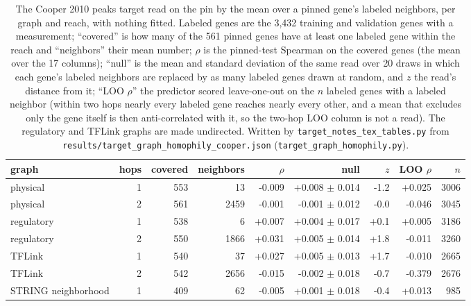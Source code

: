 \begin{table}[H]
  \centering
  \footnotesize
  \caption[Label propagation of Cooper 2010 peaks on the graphs]{The Cooper 2010 peaks target read on the pin by the mean over a pinned gene's labeled neighbors, per graph and reach, with nothing fitted. Labeled genes are the 3,432 training and validation genes with a measurement; ``covered'' is how many of the 561 pinned genes have at least one labeled gene within the reach and ``neighbors'' their mean number; $\rho$ is the pinned-test Spearman on the covered genes (the mean over the 17 columns); ``null'' is the mean and standard deviation of the same read over 20 draws in which each gene's labeled neighbors are replaced by as many labeled genes drawn at random, and $z$ the read's distance from it; ``LOO $\rho$'' the predictor scored leave-one-out on the $n$ labeled genes with a labeled neighbor (within two hops nearly every labeled gene reaches nearly every other, and a mean that excludes only the gene itself is then anti-correlated with it, so the two-hop LOO column is not a read). The regulatory and TFLink graphs are made undirected. Written by \texttt{target\_notes\_tex\_tables.py} from \texttt{results/target\_graph\_homophily\_cooper.json} (\texttt{target\_graph\_homophily.py}).}
  \label{tab:graph-homophily-cooper}
  \begin{tabular}{@{}lrrrrrrrr@{}}
    \hline
    graph & hops & covered & neighbors & $\rho$ & null & $z$ & LOO $\rho$ & $n$ \\
    \hline
    physical & 1 & 553 & 13 & -0.009 & +0.008 $\pm$ 0.014 & -1.2 & +0.025 & 3006 \\
    physical & 2 & 561 & 2459 & -0.001 & -0.001 $\pm$ 0.012 & -0.0 & -0.046 & 3045 \\
    regulatory & 1 & 538 & 6 & +0.007 & +0.004 $\pm$ 0.017 & +0.1 & +0.005 & 3186 \\
    regulatory & 2 & 550 & 1866 & +0.031 & +0.005 $\pm$ 0.014 & +1.8 & -0.011 & 3260 \\
    TFLink & 1 & 540 & 37 & +0.027 & +0.005 $\pm$ 0.013 & +1.7 & -0.010 & 2665 \\
    TFLink & 2 & 542 & 2656 & -0.015 & -0.002 $\pm$ 0.018 & -0.7 & -0.379 & 2676 \\
    STRING neighborhood & 1 & 409 & 62 & -0.005 & +0.001 $\pm$ 0.018 & -0.4 & +0.013 & 985 \\

\end{tabular}
\end{table}
